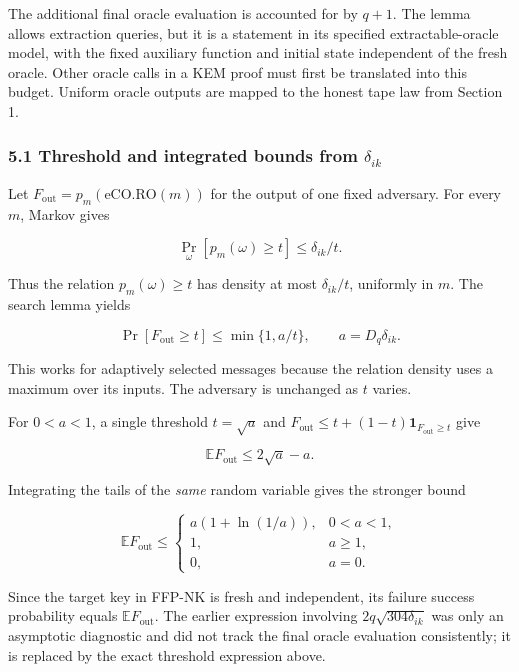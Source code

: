 \documentclass[11pt,a4paper]{article}
\begin{document}
The additional final oracle evaluation is accounted for by \(q+1\). The lemma allows extraction queries, but it is a statement in its specified extractable-oracle model, with the fixed auxiliary function and initial state independent of the fresh oracle. Other oracle calls in a KEM proof must first be translated into this budget. Uniform oracle outputs are mapped to the honest tape law from Section 1.

\subsubsection{\texorpdfstring{5.1 Threshold and integrated bounds from \(\delta_{ik}\)}{5.1 Threshold and integrated bounds from \textbackslash delta\_\{ik\}}}\label{threshold-and-integrated-bounds-from-delta_ik}

Let \(F_{\mathrm{out}}=p_m(\mathrm{eCO.RO}(m))\) for the output of one fixed adversary. For every \(m\), Markov gives

\[
\Pr_\omega[p_m(\omega)\ge t]\le\delta_{ik}/t.
\]

Thus the relation \(p_m(\omega)\ge t\) has density at most \(\delta_{ik}/t\), uniformly in \(m\). The search lemma yields

\[
\Pr[F_{\mathrm{out}}\ge t]\le\min\{1,a/t\},
\qquad a=D_q\delta_{ik}.
\]

This works for adaptively selected messages because the relation density uses a maximum over its inputs. The adversary is unchanged as \(t\) varies.

For \(0<a<1\), a single threshold \(t=\sqrt a\) and \(F_{\mathrm{out}}\le t+(1-t)\mathbf1_{F_{\mathrm{out}}\ge t}\) give

\[
\mathbb E F_{\mathrm{out}}\le 2\sqrt a-a.
\]

Integrating the tails of the \emph{same} random variable gives the stronger bound

\[
\mathbb E F_{\mathrm{out}}\le
\begin{cases}
a(1+\ln(1/a)),&0<a<1,\\
1,&a\ge1,\\
0,&a=0.
\end{cases}
\]

Since the target key in FFP-NK is fresh and independent, its failure success probability equals \(\mathbb E F_{\mathrm{out}}\). The earlier expression involving \(2q\sqrt{304\delta_{ik}}\) was only an asymptotic diagnostic and did not track the final oracle evaluation consistently; it is replaced by the exact threshold expression above.
\end{document}
